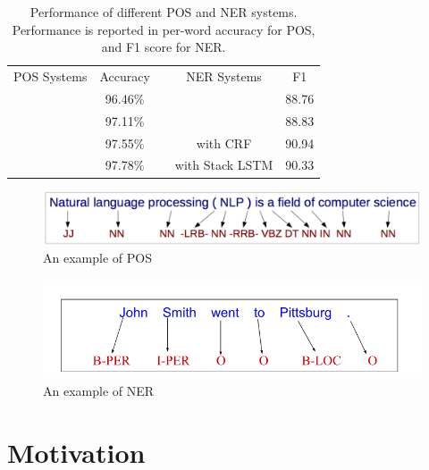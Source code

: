 \documentclass{sfuthesis}
\begin{document}
\begin{table}[]
\centering
\caption{Performance of different POS and NER systems. Performance is reported in per-word accuracy for POS, and F1 score for NER. }
\label{table:my-performance}
\begin{tabular}{cclcc}
POS Systems       & Accuracy &  & NER Systems           & F1
\\ \cline{1-2} \cline{4-5} 
\text{\cite{mccallum2000maximum}} & 96.46\%                      &  & \text{\cite{florian2003named}}                 & 88.76                  \\
\text{\cite{collins2002discriminative}}    & 97.11\%                      &  & \text{\cite{huang2015bidirectional}}           & 88.83                  \\
\text{\cite{huang2015bidirectional}}       & 97.55\%                      &  & \text{\cite{lample2016neural}} with CRF        & 90.94                  \\
\text{\cite{ling2015finding}}              & 97.78\%                      &  & \text{\cite{lample2016neural}} with Stack LSTM & 90.33                 
\end{tabular}
\end{table}

\begin{figure}
  \centering
  \includegraphics[scale=0.4]{pos-ex.png}
 \caption{An example of POS}
  \label{fig:pos-ex}
\end{figure}

\begin{figure}
  \centering
  \includegraphics[scale=0.5]{ner-ex.png}
 \caption{An example of NER}
  \label{fig:ner-ex}
\end{figure}

\section{Motivation}
\end{document}

